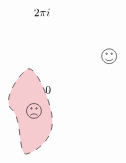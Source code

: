\documentclass[12pt]{article}
\begin{document}
\[\begin{tikzpicture}[x=0.75pt,y=0.75pt,yscale=-.8,xscale=.8]
    \draw   (190,117.75) .. controls (190,112.92) and (193.92,109) .. (198.75,109) .. controls (203.59,109) and (207.51,112.92) .. (207.51,117.75) .. controls (207.51,122.59) and (203.59,126.51) .. (198.75,126.51) .. controls (193.92,126.51) and (190,122.59) .. (190,117.75) -- cycle ; \draw   (194.9,114.78) .. controls (194.9,114.29) and (195.29,113.9) .. (195.78,113.9) .. controls (196.26,113.9) and (196.65,114.29) .. (196.65,114.78) .. controls (196.65,115.26) and (196.26,115.65) .. (195.78,115.65) .. controls (195.29,115.65) and (194.9,115.26) .. (194.9,114.78) -- cycle ; \draw   (200.85,114.78) .. controls (200.85,114.29) and (201.25,113.9) .. (201.73,113.9) .. controls (202.21,113.9) and (202.6,114.29) .. (202.6,114.78) .. controls (202.6,115.26) and (202.21,115.65) .. (201.73,115.65) .. controls (201.25,115.65) and (200.85,115.26) .. (200.85,114.78) -- cycle ; \draw   (194.38,121.25) .. controls (197.29,123.59) and (200.21,123.59) .. (203.13,121.25) ;
    \draw  [fill={rgb, 255:red, 208; green, 2; blue, 27 }  ,fill opacity=0.2 ][dash pattern={on 4.5pt off 4.5pt}] (102.51,132.89) .. controls (111.51,128.89) and (130.51,170.89) .. (131.51,193.89) .. controls (132.51,216.89) and (112.51,230.89) .. (101.51,233.89) .. controls (90.51,236.89) and (96.51,191.89) .. (83.51,180.89) .. controls (70.51,169.89) and (93.51,136.89) .. (102.51,132.89) -- cycle ;
    \draw   (101,182.75) .. controls (101,177.92) and (104.92,174) .. (109.75,174) .. controls (114.59,174) and (118.51,177.92) .. (118.51,182.75) .. controls (118.51,187.59) and (114.59,191.51) .. (109.75,191.51) .. controls (104.92,191.51) and (101,187.59) .. (101,182.75) -- cycle ; \draw   (105.9,179.78) .. controls (105.9,179.29) and (106.29,178.9) .. (106.78,178.9) .. controls (107.26,178.9) and (107.65,179.29) .. (107.65,179.78) .. controls (107.65,180.26) and (107.26,180.65) .. (106.78,180.65) .. controls (106.29,180.65) and (105.9,180.26) .. (105.9,179.78) -- cycle ; \draw   (111.85,179.78) .. controls (111.85,179.29) and (112.25,178.9) .. (112.73,178.9) .. controls (113.21,178.9) and (113.6,179.29) .. (113.6,179.78) .. controls (113.6,180.26) and (113.21,180.65) .. (112.73,180.65) .. controls (112.25,180.65) and (111.85,180.26) .. (111.85,179.78) -- cycle ; \draw   (105.38,188) .. controls (108.29,185.67) and (111.21,185.67) .. (114.13,188) ;
    
    \draw (122,152.4) node [anchor=north west][inner sep=0.75pt]  [xscale=0.8,yscale=0.8]  {$0$};
    \draw (108.4,60) node [anchor=north west][inner sep=0.75pt]  [xscale=0.8,yscale=0.8]  {$2\pi i$};
    
    
    \end{tikzpicture}
    \]
\end{document}
